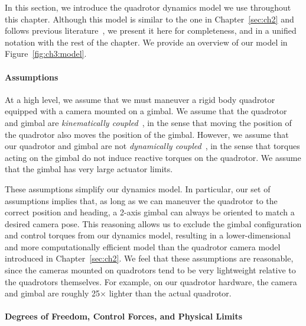 In this section, we introduce the quadrotor dynamics model we use throughout this chapter.
Although this model is similar to the one in Chapter~\ref{sec:ch2} and follows previous literature~\cite{mellinger:2011,joubert:2015}, we present it here for completeness, and in a unified notation with the rest of the chapter.
We provide an overview of our model in Figure~\ref{fig:ch3:model}.

\paragraph{Assumptions}

At a high level, we assume that we must maneuver a rigid body quadrotor equipped with a camera mounted on a gimbal. 
We assume that the quadrotor and gimbal are \emph{kinematically coupled}~\cite{kondak:2013}, in the sense that moving the position of the quadrotor also moves the position of the gimbal.
However, we assume that our quadrotor and gimbal are not \emph{dynamically coupled}~\cite{kondak:2013}, in the sense that torques acting on the gimbal do not induce reactive torques on the quadrotor.
We assume that the gimbal has very large actuator limits.

These assumptions simplify our dynamics model. 
In particular, our set of assumptions implies that, as long as we can maneuver the quadrotor to the correct position and heading, a 2-axis gimbal can always be oriented to match a desired camera pose.
This reasoning allows us to exclude the gimbal configuration and control torques from our dynamics model, resulting in a lower-dimensional and more computationally efficient model than the quadrotor camera model introduced in Chapter~\ref{sec:ch2}.
We feel that these assumptions are reasonable, since the cameras mounted on quadrotors tend to be very lightweight relative to the quadrotors themselves.
For example, on our quadrotor hardware, the camera and gimbal are roughly 25$\times$ lighter than the actual quadrotor.

\paragraph{Degrees of Freedom, Control Forces, and Physical Limits}

